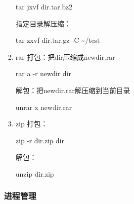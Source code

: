 \documentclass[11pt]{article}
\begin{document}
\begin{enumerate}
tar jxvf dir.tar.bz2 

指定目录解压缩：

tar zxvf dir.tar.gz -C \textasciitilde{}/test

\item rar
\label{sec-1-1-7-2}
打包：把dir压缩成newdir.rar

rar a -r newdir dir

解包：把newdir.rar解压缩到当前目录

unrar x newdir.rar
\item zip
\label{sec-1-1-7-3}
打包：

zip -r dir.zip dir

解包：

unzip dir.zip
\end{enumerate}
\subsubsection{进程管理}
\label{sec-1-1-8}
\end{document}
